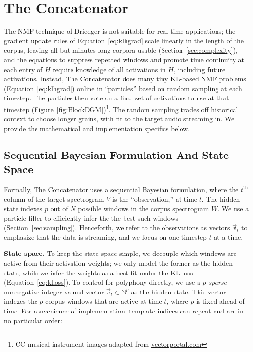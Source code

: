 \documentclass{article}
\begin{document}
\section{The Concatenator}



The NMF technique of Driedger is not suitable for real-time applications; the gradient update rules of Equation~\ref{eq:klhgrad} scale linearly in the length of the corpus, leaving all but minutes long corpora usable (Section~\ref{sec:complexity}), and the equations to suppress repeated windows and promote time continuity at each entry of $H$ require knowledge of all activations in $H$, including future activations.  Instead, The Concatenator does many tiny KL-based NMF problems (Equation~\ref{eq:klhgrad}) online in ``particles'' based on random sampling at each timestep.  The particles then vote on a final set of activations to use at that timestep (Figure~\ref{fig:BlockDGM})\footnote{CC musical instrument images adapted from \url{vectorportal.com}}.  The random sampling trades off historical context to choose longer grains, with fit to the target audio streaming in.  We provide the mathematical and implementation specifics below.

\subsection{Sequential Bayesian Formulation And State Space}
\label{sec:bayesian}

    Formally, The Concatenator uses a sequential Bayesian formulation, where the $t^{\text{th}}$ column of the target spectrogram $V$ is the ``observation,'' at time $t$.  The hidden state indexes $p$ out of $N$ possible windows in the corpus spectrogram $W$.  We use a particle filter to efficiently infer the the best such windows (Section~\ref{sec:sampling}). Henceforth, we refer to the observations as vectors $\vec{v}_t$ to emphasize that the data is streaming, and we focus on one timestep $t$ at a time.  
    
    \textbf{State space.} To keep the state space simple, we decouple which windows are active from their activation weights; we only model the former as the hidden state, while we infer the weights as a best fit under the KL-loss (Equation~\ref{eq:klloss}).  To control for polyphony directly, we use a {\em $p$-sparse} nonnegative integer-valued vector $\vec{s}_t \in \mathbb{N}^{p}$ as the hidden state.  This vector indexes the $p$ corpus windows that are active at time $t$, where $p$ is fixed ahead of time.  For convenience of implementation, template indices can repeat and are in no particular order:%
\end{document}
